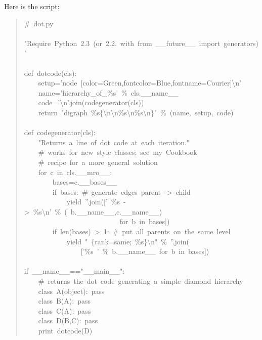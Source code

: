 \documentclass[10pt,english]{article}
\begin{document}
Here is the script:
\begin{quote}
\begin{ttfamily}\begin{flushleft}
\mbox{{\#}~dot.py~}\\
\mbox{}\\
\mbox{"Require~Python~2.3~(or~2.2.~with~from~{\_}{\_}future{\_}{\_}~import~generators)"}\\
\mbox{}\\
\mbox{def~dotcode(cls):}\\
\mbox{~~~~setup='node~[color=Green,fontcolor=Blue,fontname=Courier]{\textbackslash}n'}\\
\mbox{~~~~name='hierarchy{\_}of{\_}{\%}s'~{\%}~cls.{\_}{\_}name{\_}{\_}}\\
\mbox{~~~~code='{\textbackslash}n'.join(codegenerator(cls))}\\
\mbox{~~~~return~"digraph~{\%}s{\{}{\textbackslash}n{\textbackslash}n{\%}s{\textbackslash}n{\%}s{\textbackslash}n{\}}"~{\%}~(name,~setup,~code)}\\
\mbox{}\\
\mbox{def~codegenerator(cls):}\\
\mbox{~~~~"Returns~a~line~of~dot~code~at~each~iteration."}\\
\mbox{~~~~{\#}~works~for~new~style~classes;~see~my~Cookbook}\\
\mbox{~~~~{\#}~recipe~for~a~more~general~solution}\\
\mbox{~~~~for~c~in~cls.{\_}{\_}mro{\_}{\_}:}\\
\mbox{~~~~~~~~bases=c.{\_}{\_}bases{\_}{\_}}\\
\mbox{~~~~~~~~if~bases:~{\#}~generate~edges~parent~->~child}\\
\mbox{~~~~~~~~~~~~yield~''.join(['~{\%}s~->~{\%}s{\textbackslash}n'~{\%}~(~b.{\_}{\_}name{\_}{\_},c.{\_}{\_}name{\_}{\_})}\\
\mbox{~~~~~~~~~~~~~~~~~~~~~~~~~~~for~b~in~bases])}\\
\mbox{~~~~~~~~if~len(bases)~>~1:~{\#}~put~all~parents~on~the~same~level}\\
\mbox{~~~~~~~~~~~~yield~"~{\{}rank=same;~{\%}s{\}}{\textbackslash}n"~{\%}~''.join(}\\
\mbox{~~~~~~~~~~~~~~~~['{\%}s~'~{\%}~b.{\_}{\_}name{\_}{\_}~for~b~in~bases])}\\
\mbox{}\\
\mbox{if~{\_}{\_}name{\_}{\_}=="{\_}{\_}main{\_}{\_}":~}\\
\mbox{~~~~{\#}~returns~the~dot~code~generating~a~simple~diamond~hierarchy}\\
\mbox{~~~~class~A(object):~pass}\\
\mbox{~~~~class~B(A):~pass}\\
\mbox{~~~~class~C(A):~pass}\\
\mbox{~~~~class~D(B,C):~pass}\\
\mbox{~~~~print~dotcode(D)}
\end{flushleft}\end{ttfamily}
\end{quote}
\end{document}
